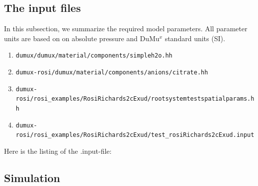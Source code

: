 \subsection*{The input files}

In this subsection, we summarize the required model parameters. All
parameter units are based on on absolute pressure and DuMu$^{x}$
standard units (SI).


\begin{enumerate}
\item \verb+dumux/dumux/material/components/simpleh2o.hh+
\item \verb+dumux-rosi/dumux/material/components/anions/citrate.hh+
\item \verb+dumux-rosi/rosi_examples/RosiRichards2cExud/rootsystemtestspatialparams.hh+
\item \verb+dumux-rosi/rosi_examples/RosiRichards2cExud/test_rosiRichards2cExud.input+
\end{enumerate}
Here is the listing of the .input-file:



\subsection*{Simulation}

